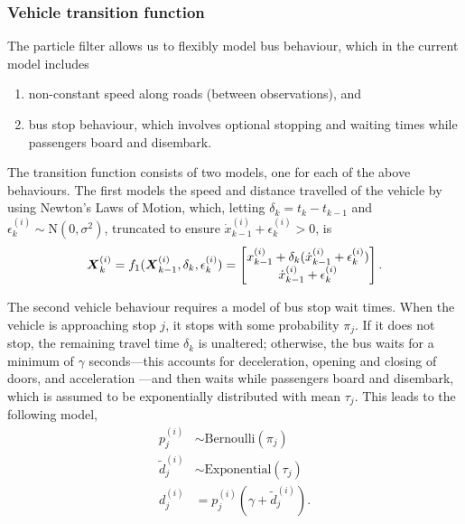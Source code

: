 \subsubsection{Vehicle transition function}
\label{sec:pf_prediction}

The particle filter allows us to flexibly model bus behaviour,
which in the current model includes
\begin{enumerate}
\item non-constant speed along roads (between observations), and
\item bus stop behaviour, which involves optional stopping and waiting times
    while passengers board and disembark.
\end{enumerate}
The transition function consists of two models,
one for each of the above behaviours.
The first models the speed and distance travelled of the vehicle 
by using Newton's Laws of Motion,
which, letting $\delta_k = t_k - t_{k-1}$ and $\epsilon_k^{(i)}\sim\mathrm{N}(0, \sigma^2)$, 
truncated to ensure $\dot x_{k-1}^{(i)} + \epsilon_k^{(i)} > 0$,
is
\begin{equation}
\label{eq:trans_newton}
\mbox{$\boldsymbol{X}$}_k^{(i)} = f_1(\mbox{$\boldsymbol{X}$}_{k-1}^{(i)}, \delta_k, \epsilon_k^{(i)}) = 
    \begin{bmatrix}
        x_{k-1}^{(i)} + \delta_k(\dot x_{k-1}^{(i)} + \epsilon_k^{(i)}) \\
        \dot x_{k-1}^{(i)} + \epsilon_k^{(i)}
    \end{bmatrix}.
\end{equation}

The second vehicle behaviour requires a model of bus stop wait times.
When the vehicle is approaching stop $j$,
it stops with some probability $\pi_j$.
If it does not stop, the remaining travel time $\delta_k$ is unaltered;
otherwise, the bus waits for a minimum of $\gamma$ seconds---this 
accounts for deceleration, opening and closing of doors, and acceleration
\citep{Hans_2015}---and then waits while passengers board and disembark,
which is assumed to be exponentially distributed with mean $\tau_j$.
This leads to the following model,
\begin{equation}
\label{eq:trans_stop}
\begin{split}
p_j^{(i)} &\sim \mathrm{Bernoulli}(\pi_j) \\
\tilde d_j^{(i)} &\sim \mathrm{Exponential}(\tau_j) \\
d_j^{(i)} &= p_j^{(i)}(\gamma + \tilde d_j^{(i)}).
\end{split}
\end{equation}


